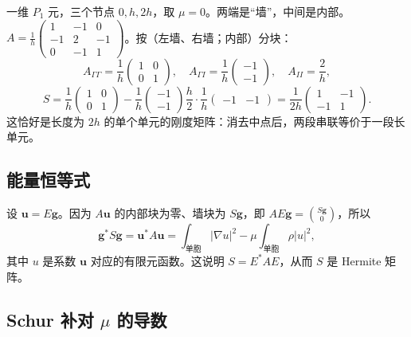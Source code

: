 \documentclass[11pt,a4paper,fontset=fandol]{ctexart}
\begin{document}
\begin{example}
一维 $P_1$ 元，三个节点 $0,h,2h$，取 $\mu=0$。两端是“墙”，中间是内部。$A=\frac1h\begin{pmatrix}1&-1&0\\-1&2&-1\\0&-1&1\end{pmatrix}$。按（左墙、右墙；内部）分块：
\[
A_{\Gamma\Gamma}=\frac1h\begin{pmatrix}1&0\\0&1\end{pmatrix},\quad
A_{\Gamma I}=\frac1h\begin{pmatrix}-1\\-1\end{pmatrix},\quad A_{II}=\frac2h ,
\]
\[
S=\frac1h\begin{pmatrix}1&0\\0&1\end{pmatrix}-\frac1h\begin{pmatrix}-1\\-1\end{pmatrix}\frac h2\cdot\frac1h\begin{pmatrix}-1&-1\end{pmatrix}
=\frac{1}{2h}\begin{pmatrix}1&-1\\-1&1\end{pmatrix}.
\]
这恰好是长度为 $2h$ 的单个单元的刚度矩阵：消去中点后，两段串联等价于一段长单元。
\end{example}

\subsection{能量恒等式}

设 $\bm u=E\bm g$。因为 $A\bm u$ 的内部块为零、墙块为 $S\bm g$，即 $AE\bm g=\binom{S\bm g}{0}$，所以
\begin{equation}
\label{eq:schur-energy}
\bm g^*S\bm g=\bm u^*A\bm u=\int_{\text{单胞}}|\nabla u|^2-\mu\int_{\text{单胞}}\rho|u|^2 ,
\end{equation}
其中 $u$ 是系数 $\bm u$ 对应的有限元函数。这说明 $S=E^*AE$，从而 $S$ 是 Hermite 矩阵。

\subsection{\texorpdfstring{Schur 补对 $\mu$ 的导数}{Schur 补对 mu 的导数}}
\label{sec:schur-deriv}
\end{document}
